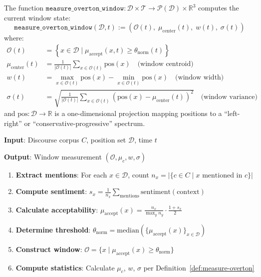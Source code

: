 \begin{definition}
\label{def:measure-overton}
The function $\mathtt{measure\_overton\_window} : \mathcal{D} \times \mathcal{T} \to
\mathcal{P}(\mathcal{D}) \times \mathbb{R}^3$ computes the current window state:
\[
\boxed{
    \mathtt{measure\_overton\_window}(\mathcal{D}, t) :=
    \left( \mathcal{O}(t), \; \mu_{\mathrm{center}}(t), \; w(t), \; \sigma(t) \right)
}
\]
where:
\begin{align}
    \mathcal{O}(t) &= \left\{ x \in \mathcal{D} \;\Big|\;
        \mu_{\mathrm{accept}}(x, t) \geq \theta_{\mathrm{norm}}(t) \right\} \\
    \mu_{\mathrm{center}}(t) &= \frac{1}{|\mathcal{O}(t)|} \sum_{x \in \mathcal{O}(t)}
        \mathrm{pos}(x) \quad \text{(window centroid)} \\
    w(t) &= \max_{x \in \mathcal{O}(t)} \mathrm{pos}(x) -
        \min_{x \in \mathcal{O}(t)} \mathrm{pos}(x) \quad \text{(window width)} \\
    \sigma(t) &= \sqrt{\frac{1}{|\mathcal{O}(t)|} \sum_{x \in \mathcal{O}(t)}
        (\mathrm{pos}(x) - \mu_{\mathrm{center}}(t))^2} \quad \text{(window variance)}
\end{align}
and $\mathrm{pos} : \mathcal{D} \to \mathbb{R}$ is a one-dimensional projection
mapping positions to a ``left-right'' or ``conservative-progressive'' spectrum.
\end{definition}

\begin{algorithm}
\label{alg:discourse-analysis}
\textbf{Input}: Discourse corpus $C$, position set $\mathcal{D}$, time $t$

\textbf{Output}: Window measurement $(\mathcal{O}, \mu_c, w, \sigma)$

\begin{enumerate}
    \item \textbf{Extract mentions}: For each $x \in \mathcal{D}$, count
          $n_x = |\{c \in C \mid x \text{ mentioned in } c\}|$
    \item \textbf{Compute sentiment}: $s_x = \frac{1}{n_x} \sum_{\text{mentions}}
          \mathrm{sentiment}(\text{context})$
    \item \textbf{Calculate acceptability}:
          $\mu_{\mathrm{accept}}(x) = \frac{n_x}{\max_y n_y} \cdot \frac{1 + s_x}{2}$
    \item \textbf{Determine threshold}:
          $\theta_{\mathrm{norm}} = \mathrm{median}(\{\mu_{\mathrm{accept}}(x)\}_{x \in \mathcal{D}})$
    \item \textbf{Construct window}: $\mathcal{O} = \{x \mid \mu_{\mathrm{accept}}(x)
          \geq \theta_{\mathrm{norm}}\}$
    \item \textbf{Compute statistics}: Calculate $\mu_c$, $w$, $\sigma$ per Definition~\ref{def:measure-overton}
\end{enumerate}
\end{algorithm}

